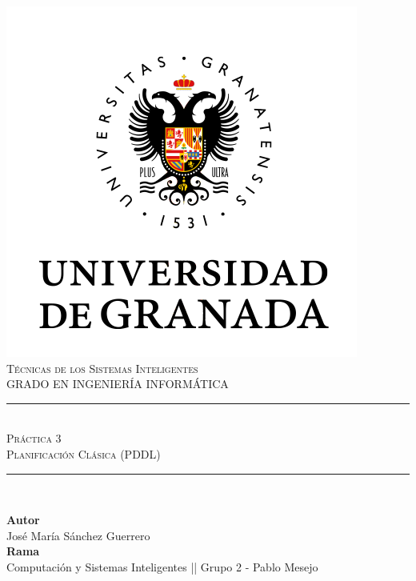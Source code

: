 \documentclass[11pt,a4paper]{article}
\newcommand{\asignatura}{Técnicas de los Sistemas Inteligentes}
\newcommand{\autor}{José María Sánchez Guerrero}
\newcommand{\titulo}{Práctica 3}
\newcommand{\subtitulo}{Planificación Clásica (PDDL)}
\begin{document}

\begin{titlepage}

\begin{minipage}{\textwidth}

\centering

\includegraphics[scale=0.5]{img/ugr.png}\\

\textsc{\Large \asignatura{}\\[0.2cm]}
\textsc{GRADO EN INGENIERÍA INFORMÁTICA}\\[1cm]

\noindent\rule[-1ex]{\textwidth}{1pt}\\[1.5ex]
\textsc{{\Huge \titulo\\[0.5ex]}}
\textsc{{\Large \subtitulo\\}}
\noindent\rule[-1ex]{\textwidth}{2pt}\\[3.5ex]

\end{minipage}

\vspace{0.5cm}

\begin{minipage}{\textwidth}

\centering

\textbf{Autor}\\ {\autor{}}\\[2.5ex]
\textbf{Rama}\\ {Computación y Sistemas Inteligentes || Grupo 2 - Pablo Mesejo}\\[2.5ex]
\vspace{0.3cm}


\end{minipage}
\end{titlepage}
\end{document}
